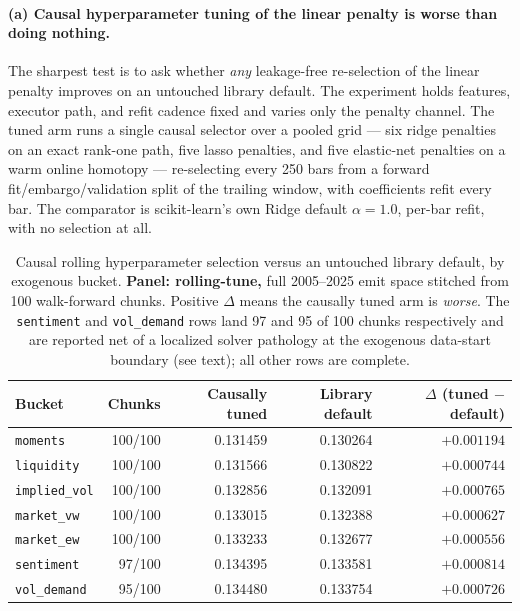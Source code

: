 \paragraph{(a) Causal hyperparameter tuning of the linear penalty is worse than
doing nothing.}
The sharpest test is to ask whether \emph{any} leakage-free re-selection of the
linear penalty improves on an untouched library default. The experiment holds
features, executor path, and refit cadence fixed and varies only the penalty
channel. The tuned arm runs a single causal selector over a pooled grid --- six
ridge penalties on an exact rank-one path, five lasso penalties, and five
elastic-net penalties on a warm online homotopy --- re-selecting every 250 bars
from a forward fit/embargo/validation split of the trailing window, with
coefficients refit every bar. The comparator is scikit-learn's own Ridge default
$\alpha = 1.0$, per-bar refit, with no selection at all.

\begin{table}[H]
\centering
\small
\caption{Causal rolling hyperparameter selection versus an untouched library
default, by exogenous bucket. \textbf{Panel: rolling-tune,} full 2005--2025 emit
space stitched from 100 walk-forward chunks. Positive $\Delta$ means the causally
tuned arm is \emph{worse}. The \texttt{sentiment} and \texttt{vol\_demand} rows
land 97 and 95 of 100 chunks respectively and are reported net of a localized
solver pathology at the exogenous data-start boundary (see text); all other rows
are complete.}
\label{tab:causal_tune_vs_default}
\begin{tabular}{@{}lrrrr@{}}
\toprule
Bucket & Chunks & Causally tuned & Library default & $\Delta$ (tuned $-$ default) \\
\midrule
\texttt{moments}      & 100/100 & 0.131459 & 0.130264 & $+0.001194$ \\
\texttt{liquidity}    & 100/100 & 0.131566 & 0.130822 & $+0.000744$ \\
\texttt{implied\_vol} & 100/100 & 0.132856 & 0.132091 & $+0.000765$ \\
\texttt{market\_vw}   & 100/100 & 0.133015 & 0.132388 & $+0.000627$ \\
\texttt{market\_ew}   & 100/100 & 0.133233 & 0.132677 & $+0.000556$ \\
\texttt{sentiment}    & 97/100  & 0.134395 & 0.133581 & $+0.000814$ \\
\texttt{vol\_demand}  & 95/100  & 0.134480 & 0.133754 & $+0.000726$ \\
\bottomrule
\end{tabular}
\end{table}

